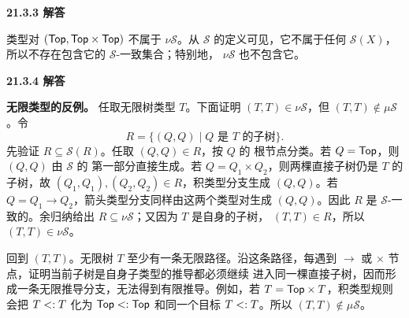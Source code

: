 \begin{taplauthorsolutionentrybox}
\label{sol:author:21.3.3}
\textbf{21.3.3 解答}

类型对 \((\mathsf{Top},\mathsf{Top}\times\mathsf{Top})\) 不属于
\(\nu\mathcal S\)。从 \(\mathcal S\) 的定义可见，它不属于任何
\(\mathcal S(X)\)，所以不存在包含它的 \(\mathcal S\)-一致集合；特别地，
\(\nu\mathcal S\) 也不包含它。

\end{taplauthorsolutionentrybox}

\begin{taplauthorsolutionentrybox}
\label{sol:author:21.3.4}
\textbf{21.3.4 解答}

\textbf{无限类型的反例。}
任取无限树类型 \(T\)。下面证明 \((T,T)\in\nu\mathcal S\)，但
\((T,T)\notin\mu\mathcal S\)。令
\[
R=\{(Q,Q)\mid Q\text{ 是 }T\text{ 的子树}\}.
\]
先验证 \(R\subseteq\mathcal S(R)\)。任取 \((Q,Q)\in R\)，按 \(Q\) 的
根节点分类。若 \(Q=\mathsf{Top}\)，则 \((Q,Q)\) 由 \(\mathcal S\) 的
第一部分直接生成。若 \(Q=Q_1\times Q_2\)，则两棵直接子树仍是 \(T\) 的
子树，故 \((Q_1,Q_1),(Q_2,Q_2)\in R\)，积类型分支生成 \((Q,Q)\)。若
\(Q=Q_1\to Q_2\)，箭头类型分支同样由这两个类型对生成 \((Q,Q)\)。因此
\(R\) 是 \(\mathcal S\)-一致的。余归纳给出
\(R\subseteq\nu\mathcal S\)；又因为 \(T\) 是自身的子树，
\((T,T)\in R\)，所以 \((T,T)\in\nu\mathcal S\)。

回到 \((T,T)\)。无限树 \(T\) 至少有一条无限路径。沿这条路径，每遇到
\(\to\) 或 \(\times\) 节点，证明当前子树是自身子类型的推导都必须继续
进入同一棵直接子树，因而形成一条无限推导分支，无法得到有限推导。例如，若
\(T=\mathsf{Top}\times T\)，积类型规则会把 \(T\mathrel{<:} T\) 化为
\(\mathsf{Top}\mathrel{<:}\mathsf{Top}\) 和同一个目标
\(T\mathrel{<:} T\)。所以 \((T,T)\notin\mu\mathcal S\)。



\end{taplauthorsolutionentrybox}
